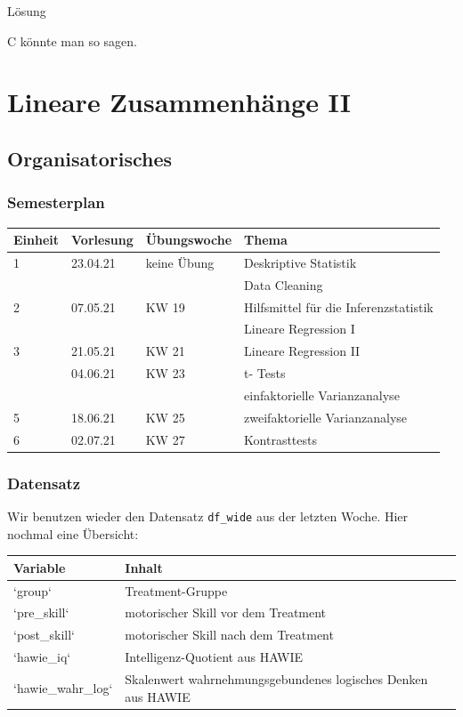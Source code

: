 \documentclass[
]{book}
\begin{document}
Lösung

C könnte man so sagen.

\hypertarget{lineare-zusammenhuxe4nge-ii}{%
\chapter{Lineare Zusammenhänge II}\label{lineare-zusammenhuxe4nge-ii}}

\hypertarget{organisatorisches-2}{%
\section{Organisatorisches}\label{organisatorisches-2}}

\hypertarget{semesterplan-3}{%
\subsection{Semesterplan}\label{semesterplan-3}}

\begin{tabular}[t]{llll}
\toprule
Einheit & Vorlesung & Übungswoche & Thema\\
\midrule
1 & 23.04.21 & keine Übung & Deskriptive Statistik\\
 &  &  & Data Cleaning\\
2 & 07.05.21 & KW 19 & Hilfsmittel für die Inferenzstatistik\\
 &  &  & Lineare Regression I\\
3 & 21.05.21 & KW 21 & Lineare Regression II\\
\addlinespace
4 & 04.06.21 & KW 23 & t- Tests\\
 &  &  & einfaktorielle Varianzanalyse\\
5 & 18.06.21 & KW 25 & zweifaktorielle Varianzanalyse\\
6 & 02.07.21 & KW 27 & Kontrasttests\\
\bottomrule
\end{tabular}

\hypertarget{datensatz-1}{%
\subsection{Datensatz}\label{datensatz-1}}

Wir benutzen wieder den Datensatz \texttt{df\_wide} aus der letzten Woche. Hier nochmal eine Übersicht:

\begin{tabular}[t]{ll}
\toprule
Variable & Inhalt\\
\midrule
`group` & Treatment-Gruppe\\
`pre\_skill` & motorischer Skill vor dem Treatment\\
`post\_skill` & motorischer Skill nach dem Treatment\\
`hawie\_iq` & Intelligenz-Quotient aus HAWIE\\
`hawie\_wahr\_log` & Skalenwert wahrnehmungsgebundenes 
 logisches Denken aus HAWIE\\
\bottomrule
\end{tabular}
\end{document}
